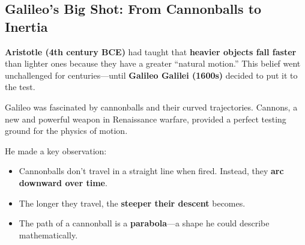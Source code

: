 
\subsection{Galileo’s Big Shot: From Cannonballs to Inertia}

\textbf{Aristotle (4th century BCE)} had taught that \textbf{heavier objects fall faster} than lighter ones because they have a greater “natural motion.” This belief went unchallenged for centuries—until \textbf{Galileo Galilei (1600s)} decided to put it to the test.

Galileo was fascinated by cannonballs and their curved trajectories. Cannons, a new and powerful weapon in Renaissance warfare, provided a perfect testing ground for the physics of motion.

He made a key observation:

\begin{itemize}
    \item Cannonballs don’t travel in a straight line when fired. Instead, they \textbf{arc downward over time}.
    \item The longer they travel, the \textbf{steeper their descent} becomes.
    \item The path of a cannonball is a \textbf{parabola}—a shape he could describe mathematically.
\end{itemize}

\begin{center}
\end{center}



